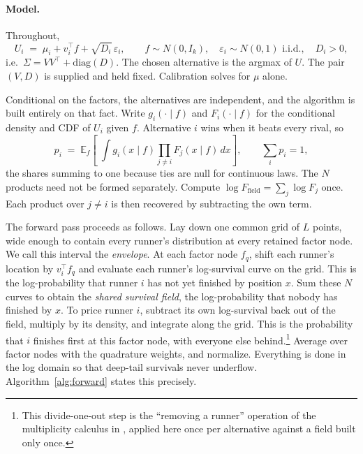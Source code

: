\documentclass[12pt]{article}
\theoremstyle{remark}
\newcommand{\E}{\mathbb{E}}
\begin{document}
\paragraph{Model.} Throughout,
\begin{equation}
U_i \;=\; \mu_i + v_i^\top f + \sqrt{D_i}\,\varepsilon_i,
\qquad f \sim N(0, I_k), \quad \varepsilon_i \sim N(0,1) \text{ i.i.d.},
\quad D_i > 0,
\label{eq:model}
\end{equation}
i.e.\ $\Sigma = VV^\top + \mathrm{diag}(D)$. The chosen alternative is the
argmax of $U$. The pair $(V, D)$ is supplied and held fixed.
Calibration solves for $\mu$ alone.

Conditional on the factors, the alternatives are independent, and the
algorithm is built entirely on that fact. Write $g_i(\cdot \mid f)$ and
$F_i(\cdot \mid f)$ for the conditional density and CDF of $U_i$ given
$f$. Alternative $i$ wins when it beats every rival, so
\begin{equation}
p_i \;=\; \E_f\!\left[\;\int g_i(x \mid f)
\prod_{j \neq i} F_j(x \mid f)\, dx \right],
\qquad \sum_i p_i = 1,
\label{eq:forward}
\end{equation}
the shares summing to one because ties are null for continuous laws.
The $N$ products need not be formed
separately. Compute $\log F_{\mathrm{field}} = \sum_j \log F_j$ once.
Each product over $j \ne i$ is then recovered by subtracting the own
term.

The forward pass proceeds as follows. Lay down one common
grid of $L$ points, wide enough to contain every runner's distribution
at every retained factor node. We call this interval the
\emph{envelope}. At each factor node $f_q$, shift each
runner's location by $v_i^\top f_q$ and evaluate each runner's
log-survival curve on the grid. This is the log-probability that runner
$i$ has not yet finished by position $x$. Sum these $N$ curves to obtain the
\emph{shared survival field}, the log-probability that nobody has
finished by $x$. To price runner $i$, subtract its own log-survival
back out of the field, multiply by its density, and integrate along the
grid. This is the probability that $i$ finishes first at this factor
node, with everyone else behind.\footnote{This divide-one-out step is
the ``removing a runner'' operation of the multiplicity calculus in
\citet{cotton2021}, applied here once per alternative against a field
built only once.} Average over factor nodes with the
quadrature weights, and normalize. Everything is done in the log domain
so that deep-tail survivals never underflow. Algorithm~\ref{alg:forward}
states this precisely.
\end{document}
